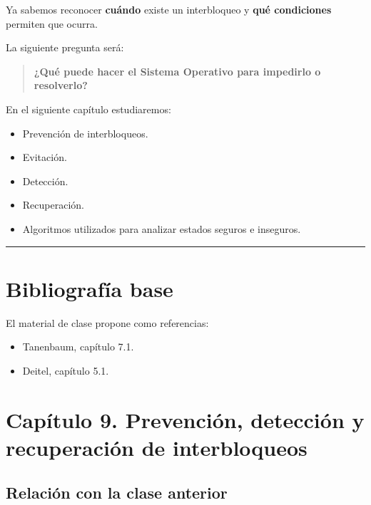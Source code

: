 \documentclass[
  spanish,
  letterpaper,
]{scrbook}
\providecommand{\tightlist}{%
  \setlength{\itemsep}{0pt}\setlength{\parskip}{0pt}}
\begin{document}
Ya sabemos reconocer \textbf{cuándo} existe un interbloqueo y
\textbf{qué condiciones} permiten que ocurra.

La siguiente pregunta será:

\begin{quote}
\textbf{¿Qué puede hacer el Sistema Operativo para impedirlo o
resolverlo?}
\end{quote}

En el siguiente capítulo estudiaremos:

\begin{itemize}
\tightlist
\item
  Prevención de interbloqueos.
\item
  Evitación.
\item
  Detección.
\item
  Recuperación.
\item
  Algoritmos utilizados para analizar estados seguros e inseguros.
\end{itemize}

\begin{center}\rule{0.5\linewidth}{0.5pt}\end{center}


\chapter{Bibliografía base}\label{bibliografuxeda-base}

El material de clase propone como referencias:

\begin{itemize}
\tightlist
\item
  Tanenbaum, capítulo 7.1.
\item
  Deitel, capítulo 5.1.
\end{itemize}


\chapter{Capítulo 9. Prevención, detección y recuperación de
interbloqueos}\label{capuxedtulo-9.-prevenciuxf3n-detecciuxf3n-y-recuperaciuxf3n-de-interbloqueos}

\section{Relación con la clase
anterior}\label{relaciuxf3n-con-la-clase-anterior-3}
\end{document}
